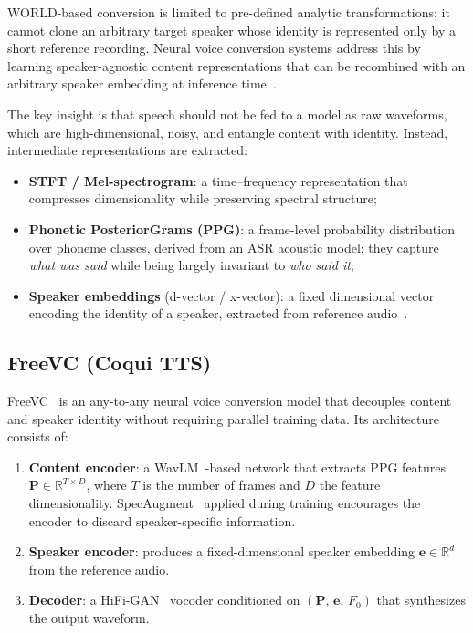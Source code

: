 \documentclass[conference]{IEEEtran}
\begin{document}
WORLD-based conversion is limited to pre-defined analytic
transformations; it cannot clone an arbitrary target speaker whose
identity is represented only by a short reference recording.
Neural voice conversion systems address this by learning speaker-agnostic
content representations that can be recombined with an arbitrary speaker
embedding at inference time~\cite{b_freevc}.

The key insight is that speech should not be fed to a model as raw
waveforms, which are high-dimensional, noisy, and entangle content
with identity.  Instead, intermediate representations are extracted:
\begin{itemize}
  \item \textbf{STFT / Mel-spectrogram}: a time--frequency
        representation that compresses dimensionality while preserving
        spectral structure;
  \item \textbf{Phonetic PosteriorGrams (PPG)}: a frame-level
        probability distribution over phoneme classes, derived from
        an ASR acoustic model; they capture \emph{what was said} while
        being largely invariant to \emph{who said it};
  \item \textbf{Speaker embeddings} (d-vector / x-vector): a fixed
        dimensional vector encoding the identity of a speaker,
        extracted from reference audio~\cite{b_xvector}.
\end{itemize}

\subsection{FreeVC (Coqui TTS)}
\label{sec:freevc}

FreeVC~\cite{b_freevc} is an any-to-any neural voice conversion model
that decouples content and speaker identity without requiring
parallel training data.  Its architecture consists of:

\begin{enumerate}
  \item \textbf{Content encoder}: a WavLM~\cite{b_wavlm}-based network
        that extracts PPG features
        $\mathbf{P}\in\mathbb{R}^{T\times D}$,
        where $T$ is the number of frames and $D$ the feature
        dimensionality.  SpecAugment~\cite{b_specaugment} applied
        during training encourages the encoder to discard
        speaker-specific information.
  \item \textbf{Speaker encoder}: produces a fixed-dimensional
        speaker embedding $\mathbf{e}\in\mathbb{R}^{d}$ from the
        reference audio.
  \item \textbf{Decoder}: a HiFi-GAN~\cite{b_hifigan}
        vocoder conditioned on $(\mathbf{P},\, \mathbf{e},\, F_0)$
        that synthesizes the output waveform.
\end{enumerate}
\end{document}
